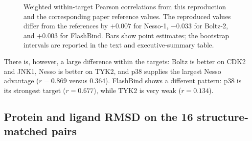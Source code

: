 \documentclass[11pt]{article}
\begin{document}
\begin{figure}[H]
\centering
{}
\caption{Weighted within-target Pearson correlations from this reproduction
and the corresponding paper reference values. The reproduced values differ
from the references by $+0.007$ for Nesso-1, $-0.033$ for Boltz-2, and
$+0.003$ for FlashBind. Bars show point estimates; the bootstrap intervals
are reported in the text and executive-summary table.}
\end{figure}

There is, however, a large difference within the targets: Boltz is better on
CDK2 and JNK1,
Nesso is better on TYK2, and p38 supplies the largest Nesso advantage
($r=0.869$ versus $0.364$).
FlashBind shows a different pattern: p38 is its strongest target
($r=0.677$), while TYK2 is very weak ($r=0.134$). 

\subsection{Protein and ligand RMSD on the 16 structure-matched pairs}
\end{document}
